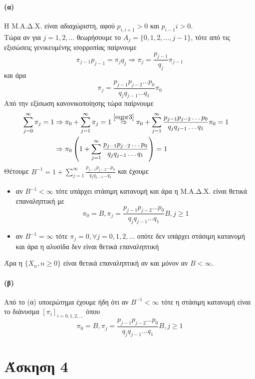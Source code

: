 \documentclass[a4paper,11pt]{article}
\begin{document}
\paragraph{(α)}
Η Μ.Α.Δ.Χ. είναι αδιαχώριστη, αφού $p_{i,i+1} > 0$ και $p_{i-1}{i} > 0$.
\\[8pt]
Τώρα αν για $j=1,2,\dots$ θεωρήσουμε το $A_j = \{0,1,2,\dots,j-1\}$, τότε από τις εξισώσεις γενικευμένης ισορροπίας παίρνουμε
\[
	\pi_{j-1} p_{j-1} = \pi_j q_j \Rightarrow \pi_j = \frac{p_{j-1}}{q_j} \pi_{j-1}
\]
και άρα
\begin{equation}
	\pi_j = \frac{p_{j-1} p_{j-2} \dots p_0}{q_j q_{j-1} \dots q_1} \pi_0 \label{eqpr3}
\end{equation}
Από την εξίσωση κανονικοποίησης τώρα παίρνουμε
\begin{align*}
	\sum_{j=0}^\infty \pi_j = 1 &\Rightarrow \pi_0 + \sum_{j=1}^\infty \pi_j = 1
		\stackrel{\eqref{eqpr3}}{\Rightarrow} \pi_0 + \sum_{j=1}^\infty \frac{p_{j-1} p_{j-2} \dots p_0}{q_j q_{j-1} \dots q_1} \pi_0 = 1 &\\
		&\Rightarrow \pi_0 \left(1 + \sum_{j=1}^\infty \frac{p_{j-1} p_{j-2} \dots p_0}{q_j q_{j-1} \dots q_1} \right) = 1
\end{align*}
Θέτουμε $B^{-1} = 1 + \sum_{j=1}^\infty \frac{p_{j-1} p_{j-2} \dots p_0}{q_j q_{j-1} \dots q_1}$ και έχουμε
\begin{itemize}
	\item αν $B^{-1} < \infty$ τότε υπάρχει στάσιμη κατανομή και άρα η Μ.Α.Δ.Χ. είναι θετικά επαναληπτική με
		\[\pi_0=B, \pi_j = \frac{p_{j-1} p_{j-2} \dots p_0}{q_j q_{j-1} \dots q_1} B, j \geq 1\]
	\item αν $B^{-1} = \infty$ τότε $\pi_j = 0, \forall j = 0,1,2,\dots$ οπότε δεν υπάρχει στάσιμη κατανομή και άρα η αλυσίδα δεν είναι θετικά επαναληπτική
\end{itemize}
Άρα η $\{X_n,n\geq 0\}$ είναι θετικά επαναληπτική αν και μόνον αν $B < \infty$.

\paragraph{(β)}
Από το (α) υποερώτημα έχουμε ήδη ότι αν $B^{-1} < \infty$ τότε η στάσιμη κατανομή είναι το διάνυσμα $[\pi_i]_{i=0,1,2,\dots}$ όπου
\[\pi_0=B, \pi_j = \frac{p_{j-1} p_{j-2} \dots p_0}{q_j q_{j-1} \dots q_1} B, j \geq 1\]


\section*{Άσκηση 4}
\end{document}
